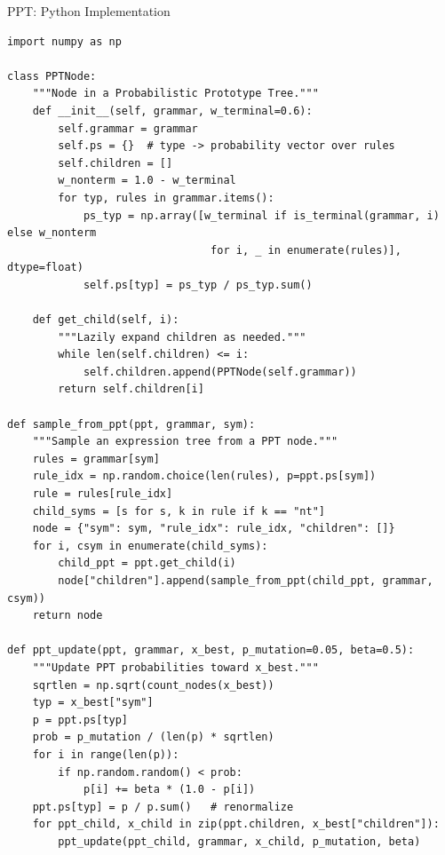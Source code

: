 \documentclass[aspectratio=169,10pt]{beamer}
\begin{document}
\begin{frame}[fragile]{PPT: Python Implementation}
\begin{lstlisting}[style=python]
import numpy as np

class PPTNode:
    """Node in a Probabilistic Prototype Tree."""
    def __init__(self, grammar, w_terminal=0.6):
        self.grammar = grammar
        self.ps = {}  # type -> probability vector over rules
        self.children = []
        w_nonterm = 1.0 - w_terminal
        for typ, rules in grammar.items():
            ps_typ = np.array([w_terminal if is_terminal(grammar, i) else w_nonterm
                                for i, _ in enumerate(rules)], dtype=float)
            self.ps[typ] = ps_typ / ps_typ.sum()

    def get_child(self, i):
        """Lazily expand children as needed."""
        while len(self.children) <= i:
            self.children.append(PPTNode(self.grammar))
        return self.children[i]

def sample_from_ppt(ppt, grammar, sym):
    """Sample an expression tree from a PPT node."""
    rules = grammar[sym]
    rule_idx = np.random.choice(len(rules), p=ppt.ps[sym])
    rule = rules[rule_idx]
    child_syms = [s for s, k in rule if k == "nt"]
    node = {"sym": sym, "rule_idx": rule_idx, "children": []}
    for i, csym in enumerate(child_syms):
        child_ppt = ppt.get_child(i)
        node["children"].append(sample_from_ppt(child_ppt, grammar, csym))
    return node

def ppt_update(ppt, grammar, x_best, p_mutation=0.05, beta=0.5):
    """Update PPT probabilities toward x_best."""
    sqrtlen = np.sqrt(count_nodes(x_best))
    typ = x_best["sym"]
    p = ppt.ps[typ]
    prob = p_mutation / (len(p) * sqrtlen)
    for i in range(len(p)):
        if np.random.random() < prob:
            p[i] += beta * (1.0 - p[i])
    ppt.ps[typ] = p / p.sum()   # renormalize
    for ppt_child, x_child in zip(ppt.children, x_best["children"]):
        ppt_update(ppt_child, grammar, x_child, p_mutation, beta)
\end{lstlisting}
\end{frame}
\end{document}
